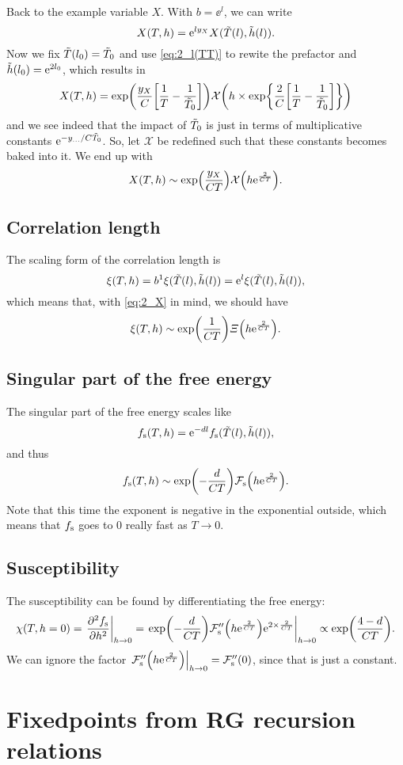 \documentclass[11pt,letter, swedish, english
]{article}
\begin{document}
Back to the example variable $X$. With $b=\ee^l$, we can write
\begin{equation}
X(T, h) = \mathrm{e}^{ly_X} X(\tilde{T}(l), \tilde{h}(l)).
\end{equation}
Now we fix $\tilde{T}(l_0)=\tilde{T}_0$ and use \eqref{eq:2_l(TT)} to rewite the
prefactor and $\tilde{h}(l_0) = \mathrm{e}^{2l_0}$, which results in
\begin{equation}
X(T, h) = \exp(\frac{y_X}{C}\qty[\frac{1}{T}-\frac{1}{\tilde{T}_0}])
\mathcal{X}\qty(h\times\exp{\frac{2}{C}\qty[\frac{1}{T}-\frac{1}{\tilde{T}_0}]})
\end{equation}
and we see indeed that the impact of $\tilde{T}_0$ is just in terms of
multiplicative constants $\mathrm{e}^{-y_{...}/C\tilde{T}_0}$. So, let
$\mathcal{X}$ be redefined such that these constants becomes baked
into it. We end up with
\begin{equation}\label{eq:2_X}
X(T, h) \sim \exp(\frac{y_X}{CT})
\mathcal{X}\qty(h\mathrm{e}^{\frac{2}{CT}}).
\end{equation}


\subsection{Correlation length}
The scaling form of the correlation length is
\begin{equation}
\xi(T, h) = b^1 \xi(\tilde{T}(l), \tilde{h}(l))= \mathrm{e}^l \xi(\tilde{T}(l), \tilde{h}(l)),
\end{equation}
which means that, with \eqref{eq:2_X} in mind, we should have
\begin{equation}
\xi(T, h)  \sim \exp(\frac{1}{CT})
\varXi\qty(h\mathrm{e}^{\frac{2}{CT}}).
\end{equation}

\subsection{Singular part of the free energy}
The singular part of the free energy scales like
\begin{equation}
f_{\text{s}}(T, h) = \mathrm{e}^{-dl}f_{\text{s}}(\tilde{T}(l), \tilde{h}(l)),
\end{equation}
and thus
\begin{equation}
f_{\text{s}}(T, h) \sim \exp(-\frac{d}{CT})
\mathcal{F}_\text{s}\qty(h\mathrm{e}^{\frac{2}{CT}}).
\end{equation}
Note that this time the exponent is negative in the exponential
outside, which means that $f_{\text{s}}$ goes to 0 really fast as $T\to0$. 

\subsection{Susceptibility}
The susceptibility can be found by differentiating the free energy:
\begin{equation}
\chi(T, h=0) = \eval{\pdv[2]{\fs}{h}}_{h\to0}
=\eval{\exp(-\frac{d}{CT})
\mathcal{F}_\text{s}''\qty(h\ee^{\frac{2}{CT}})\ee^{2\times\frac{2}{CT}}
}_{h\to0}
\propto \exp(\frac{4-d}{CT}).
\end{equation}
We can ignore the factor 
$\eval{\mathcal{F}_\text{s}''\qty(h\ee^{\frac{2}{CT}})}_{h\to0} 
= \mathcal{F}_\text{s}''(0)$, since that is just a constant. 



\section{Fixedpoints from RG recursion relations}
\end{document}
